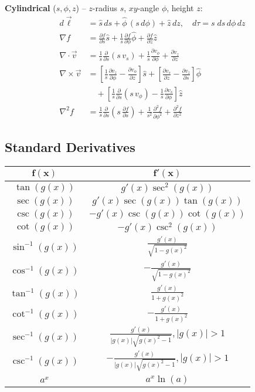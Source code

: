 \documentclass[12pt, a4paper]{article}
\begin{document}
\begin{multicols*}{3}
\textbf{Cylindrical} ($s, \phi, z$) -- $z$-radius $s$, $xy$-angle $\phi$, height $z$:
\begin{align*}
  d\vec{\ell} &= \hat{s}\,ds 
        + \hat{\phi}\,(s\,d\phi)
        + \hat{z}\,dz,\quad d\tau = s \; ds\,d\phi\,dz\\
  \nabla f &= \frac{\partial f}{\partial s}\hat{s}
           + \frac{1}{s}\frac{\partial f}{\partial \phi}\hat{\phi}
           + \frac{\partial f}{\partial z}\hat{z}\\
  \nabla \cdot \vec{v} &= \frac{1}{s}\frac{\partial}{\partial s}(s\, v_{s})
                       + \frac{1}{s}\frac{\partial v_{\phi}}{\partial \phi}
                       + \frac{\partial v_{z}}{\partial z}\\
  \nabla \times \vec{v} &= \left[\frac{1}{s}\frac{\partial v_{z}}{\partial \phi}
                          - \frac{\partial v_{\phi}}{\partial z}\right]\hat{s}
                        + \left[\frac{\partial v_{s}}{\partial z}
                          - \frac{\partial v_{z}}{\partial s}\right]\hat{\phi}\\
                        &\quad + \left[\frac{1}{s}\frac{\partial}{\partial s}(s\, v_{\phi})
                          - \frac{1}{s}\frac{\partial v_{s}}{\partial \phi}\right]\hat{z}\\
  \nabla^{2} f &= \frac{1}{s}\frac{\partial}{\partial s}\!\left(s\,\frac{\partial f}{\partial s}\right)
               + \frac{1}{s^{2}}\frac{\partial^{2} f}{\partial \phi^{2}}
               + \frac{\partial^{2} f}{\partial z^{2}}
\end{align*}

\colbreak
\subsection{Standard Derivatives}
{\centering
\begin{tabular}{|c|c|}
\hline
$\mathbf{f(x)}$ & $\mathbf{f'(x)}$ \\ \hline
$\tan(g(x))$ & $g'(x)\sec^2(g(x))$ \\ \hline
$\sec(g(x))$ & $g'(x)\sec(g(x))\tan(g(x))$ \\ \hline
$\csc(g(x))$ & $-g'(x)\csc(g(x))\cot(g(x))$ \\ \hline
$\cot(g(x))$ & $-g'(x)\csc^2(g(x))$ \\ \hline
$\sin^{-1}(g(x))$ & $\frac{g'(x)}{\sqrt{1-g(x)^2}}$ \\ \hline
$\cos^{-1}(g(x))$ & $-\frac{g'(x)}{\sqrt{1-g(x)^2}}$ \\ \hline
$\tan^{-1}(g(x))$ & $\frac{g'(x)}{1+g(x)^2}$ \\ \hline
$\cot^{-1}(g(x))$ & $-\frac{g'(x)}{1+g(x)^2}$ \\ \hline
$\sec^{-1}(g(x))$ & $\frac{g'(x)}{|g(x)|\sqrt{g(x)^2 - 1}}, |g(x)|>1$ \\ \hline
$\csc^{-1}(g(x))$ & $-\frac{g'(x)}{|g(x)|\sqrt{g(x)^2 - 1}}, |g(x)|>1$ \\ \hline
$a^x$ & $a^x\ln(a)$ \\ \hline
\end{tabular}
\par}


\end{multicols*}
\end{document}
